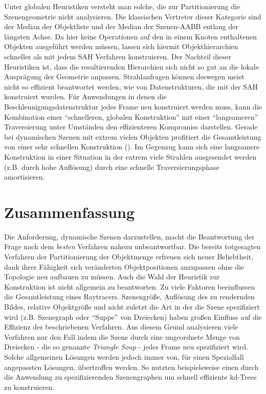 Unter globalen Heuristiken versteht man solche, die zur Partitionierung die Szenengeometrie nicht analysieren. Die klassischen Vertreter dieser Kategorie sind der Median der Objektliste und der Median der Szenen-AABB entlang der längsten Achse. Da hier keine Operationen auf den in einem Knoten enthaltenen Objekten ausgeführt werden müssen, lassen sich hiermit Objekthierarchien schneller als mit jedem SAH Verfahren konstruieren.
Der Nachteil dieser Heuristiken ist, dass die resultierenden Hierarchien sich nicht so gut an die lokale Ausprägung der Geometrie anpassen. Strahlanfragen können deswegen meist nicht so effizient beantwortet werden, wie von Datenstrukturen, die mit der SAH konstruiert wurden. Für Anwendungen in denen die Beschleunigungsdatenstruktur jedes Frame neu konstruiert werden muss, kann die Kombination einer ``schnelleren, globalen Konstruktion'' mit einer ``langsameren'' Traversierung unter Umständen den effizienteren Kompromiss darstellen. Gerade bei dynamischen Szenen mit extrem vielen Objekten profitiert die Gesamtleistung von einer sehr schnellen Konstruktion (\cite{BIH06}). Im Gegenzug kann sich eine langsamere Konstruktion in einer Situation in der extrem viele Strahlen ausgesendet werden (z.B. durch hohe Auflösung) durch eine schnelle Traversierungsphase amortisieren.

\section{Zusammenfassung}

Die Anforderung, dynamische Szenen darzustellen, macht die Beantwortung der Frage nach dem \textit{besten} Verfahren nahezu unbeantwortbar. Die bereits totgesagten Verfahren der Partitionierung der Objektmenge erfreuen sich neuer Beliebtheit, dank ihrer Fähigkeit sich veränderten Objektpositionen anzupassen ohne die Topologie neu aufbauen zu müssen.
Auch die Wahl der Heuristik zur Konstruktion ist nicht allgemein zu beantworten. Zu viele Faktoren beeinflussen die Gesamtleistung eines Raytracers. Szenengröße, Auflösung des zu rendernden Bildes, relative Objektgröße und nicht zuletzt die Art in der die Szene spezifiziert wird (z.B. Szenegraph oder ``Suppe'' von Dreiecken) haben großen Einfluss auf die Effizienz der beschriebenen Verfahren.
Aus diesem Grund analysieren viele Verfahren nur den Fall indem die Szene durch eine ungeordnete Menge von Dreiecken - die so genannte \textit{Triangle Soup} - jedes Frame neu spezifiziert wird. Solche allgemeinen Lösungen werden jedoch immer von, für einen Spezialfall angepassten Lösungen, übertroffen werden. So nutzten beispielsweise \cite{RAZOR07} einen durch die Anwendung zu spezifizierenden Szenengraphen um schnell effiziente kd-Trees zu konstruieren.
